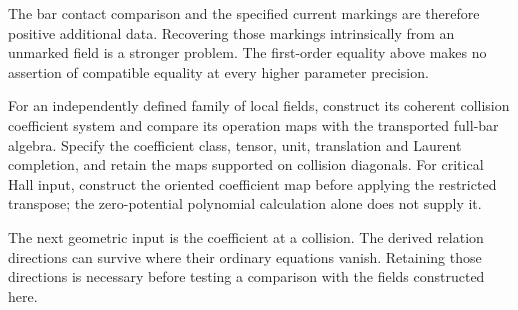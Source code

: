 The bar contact comparison and the specified current markings are
therefore positive additional data. Recovering those markings
intrinsically from an unmarked field is a stronger problem. The
first-order equality above makes no assertion of compatible equality
at every higher parameter precision.

\begin{problem}\label{cyjets:prob:realization}
For an independently defined family of local fields, construct its
coherent collision coefficient system and compare its operation
maps with the transported full-bar algebra. Specify the coefficient
class, tensor, unit, translation and Laurent completion, and retain
the maps supported on collision diagonals. For critical Hall input,
construct the oriented coefficient map before applying the restricted
transpose; the zero-potential polynomial calculation alone does not
supply it.
\end{problem}

The next geometric input is the coefficient at a collision. The
derived relation directions can survive where their ordinary
equations vanish. Retaining those directions is necessary before
testing a comparison with the fields constructed here.
\endgroup
